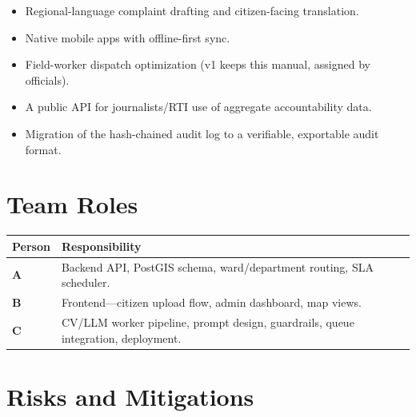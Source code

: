 \documentclass[12pt,a4paper]{article}
\begin{document}
\begin{itemize}
    \item Regional-language complaint drafting and citizen-facing translation.
    \item Native mobile apps with offline-first sync.
    \item Field-worker dispatch optimization (v1 keeps this manual, assigned by officials).
    \item A public API for journalists/RTI use of aggregate accountability data.
    \item Migration of the hash-chained audit log to a verifiable, exportable audit format.
\end{itemize}

\section{Team Roles}

\begin{center}
\begin{tabular}{>{\bfseries}p{} p{}}
\toprule
Person & Responsibility \\
\midrule
A & Backend API, PostGIS schema, ward/department routing, SLA scheduler. \\
B & Frontend---citizen upload flow, admin dashboard, map views. \\
C & CV/LLM worker pipeline, prompt design, guardrails, queue integration, deployment. \\
\bottomrule
\end{tabular}
\end{center}

\section{Risks and Mitigations}
\end{document}

